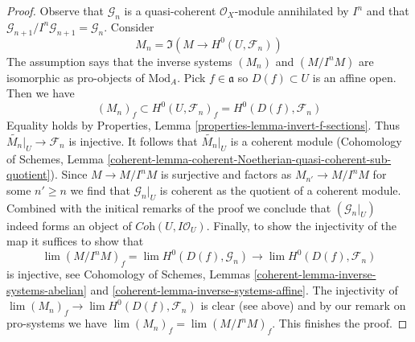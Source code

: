 \begin{proof}
Observe that $\mathcal{G}_n$ is a quasi-coherent $\mathcal{O}_X$-module
annihilated by $I^n$ and that
$\mathcal{G}_{n + 1}/I^n\mathcal{G}_{n + 1} = \mathcal{G}_n$.
Consider
$$
M_n = \Im(M \longrightarrow H^0(U, \mathcal{F}_n))
$$
The assumption says that the inverse systems $(M_n)$ and
$(M/I^nM)$ are isomorphic as pro-objects of $\text{Mod}_A$.
Pick $f \in \mathfrak a$ so $D(f) \subset U$ is an affine open. Then we have
$$
(M_n)_f \subset H^0(U, \mathcal{F}_n)_f = H^0(D(f), \mathcal{F}_n)
$$
Equality holds by Properties, Lemma \ref{properties-lemma-invert-f-sections}.
Thus $\widetilde{M_n}|_U \to \mathcal{F}_n$ is injective.
It follows that $\widetilde{M_n}|_U$ is a coherent module
(Cohomology of Schemes, Lemma
\ref{coherent-lemma-coherent-Noetherian-quasi-coherent-sub-quotient}).
Since $M \to M/I^nM$ is surjective and factors as
$M_{n'} \to M/I^nM$ for some $n' \geq n$ we find that $\mathcal{G}_n|_U$
is coherent as the quotient of a coherent module.
Combined with the initical remarks of the proof we conclude
that $(\mathcal{G}_n|_U)$ indeed forms an object
of $\textit{Coh}(U, I\mathcal{O}_U)$.
Finally, to show the injectivity of the map
it suffices to show that
$$
\lim (M/I^nM)_f = \lim H^0(D(f), \mathcal{G}_n) \to
\lim H^0(D(f), \mathcal{F}_n)
$$
is injective, see Cohomology of Schemes, Lemmas
\ref{coherent-lemma-inverse-systems-abelian} and
\ref{coherent-lemma-inverse-systems-affine}.
The injectivity of $\lim (M_n)_f \to \lim H^0(D(f), \mathcal{F}_n)$
is clear (see above) and by our remark on pro-systems we have
$\lim (M_n)_f = \lim (M/I^nM)_f$. This finishes the proof.
\end{proof}

